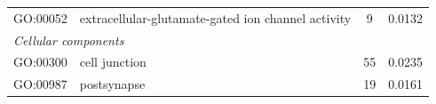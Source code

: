 \documentclass[10pt,letterpaper]{article}
\begin{document}
\begin{table}[]
\begin{tabular}{llcc}
GO:00052                                & extracellular-glutamate-gated ion channel activity & 9                                                                                        & 0.0132                           \\
\multicolumn{4}{l}{\textit{Cellular components}}                                                                                                                                                                                    \\
GO:00300                                & cell junction                                      & 55                                                                                       & 0.0235                              \\
GO:00987                                 & postsynapse                                        & 19                                                                                       & 0.0161                            
\end{tabular}
\end{table}

\end{document}
